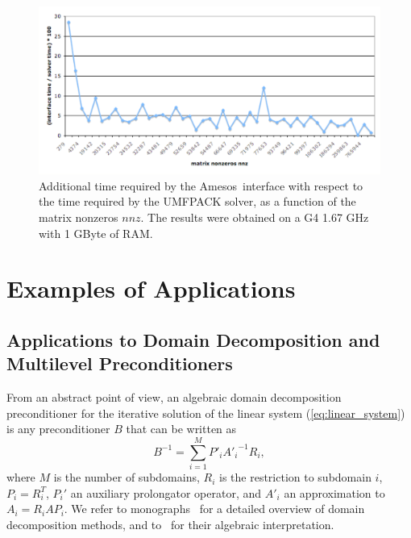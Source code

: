 \documentclass[acmtoms,acmnow]{acmtrans2m}
\newcommand{\amesos}{{\sc Amesos}}
\begin{document}
\begin{figure}
\begin{center}
\includegraphics[width=12cm]{umfpack_time.pdf}
\caption{Additional time required by the \amesos\ interface with respect to the
time required by the UMFPACK solver,  as a function of the matrix
  nonzeros $nnz$.
The results were obtained on a G4 1.67 GHz with 1 GByte of RAM.}
\label{fig:results2}
\end{center}
\end{figure}

\section{Examples of Applications}
\label{sec:example}

\subsection{Applications to Domain Decomposition and Multilevel Preconditioners}
\label{sec:preconditioner}

From an abstract point of view, an algebraic domain decomposition
preconditioner for the iterative solution of the linear system
(\ref{eq:linear_system})
is any preconditioner $B$ that can be written as
\begin{equation}
\label{eq:prec}
B^{-1} = \sum_{i=1}^M P'_i {A'_i}^{-1} R_i,
\end{equation}
where
$M$ is the number of subdomains, $R_i$ is the restriction to subdomain $i$,
  $P_i = R_i^T$, $P_i'$ an auxiliary prolongator operator, and
$A'_i$ an approximation to $A_i = R_i A P_i$.  We refer to
monographs~\cite{QV2,smith96parallel} for a detailed
overview of domain decomposition methods, and to~\cite{saad96iterative} for their
algebraic interpretation.
\end{document}
